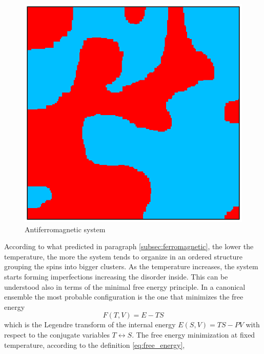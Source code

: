\begin{figure}[h]
\begin{minipage}[c]{0.32\textwidth}
    \end{minipage}
    \hfill
    \begin{minipage}[c]{0.32\textwidth}
        \centering
        \includegraphics[scale=0.38]{./images/ising/T_n001_antiferro.eps}
    \end{minipage}
    \centering 
    \caption{Antiferromagnetic system}
    \label{fig:MC_single_final_state_antiferro}
\end{figure}
According to what predicted in paragraph \ref{subsec:ferromagnetic}, the lower the temperature, the more the system tends to organize
in an ordered structure grouping the spins into bigger clusters. As the temperature increases, the system starts forming imperfections increasing the disorder inside. This can be understood 
also in terms of the minimal free energy principle. In a canonical ensemble the most probable configuration is the one that minimizes the free energy
\begin{equation}
    F(T, V) = E - TS
    \label{eq:free_energy}
\end{equation}
which is the Legendre transform of the internal energy $E(S, V) = TS - PV$ with respect to the conjugate variables $T \leftrightarrow S$. The free energy minimization at fixed temperature, according to the definition \ref{eq:free_energy},
